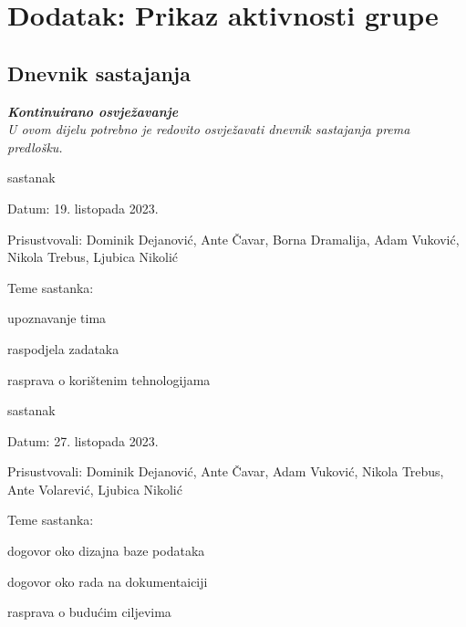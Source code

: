 \chapter*{Dodatak: Prikaz aktivnosti grupe}
		
		\section*{Dnevnik sastajanja}
		
		\textbf{\textit{Kontinuirano osvježavanje}}\\
		
		 \textit{U ovom dijelu potrebno je redovito osvježavati dnevnik sastajanja prema predlošku.}
		
		\begin{packed_enum}
			\item  sastanak
			
			\item[] \begin{packed_item}
				\item Datum: 19. listopada 2023.
				\item Prisustvovali: Dominik Dejanović, Ante Čavar, Borna Dramalija, Adam Vuković, Nikola Trebus, Ljubica Nikolić
				\item Teme sastanka:
				\begin{packed_item}
					\item  upoznavanje tima
					\item  raspodjela zadataka
					\item rasprava o korištenim tehnologijama
				\end{packed_item}
			\end{packed_item}
			
			\item  sastanak
			\item[] \begin{packed_item}
				\item Datum: 27. listopada 2023.
				\item Prisustvovali: Dominik Dejanović, Ante Čavar, Adam Vuković, Nikola Trebus, Ante Volarević, Ljubica Nikolić
				\item Teme sastanka:
				\begin{packed_item}
					\item  dogovor oko dizajna baze podataka
					\item  dogovor oko rada na dokumentaiciji
					\item rasprava o budućim ciljevima
				\end{packed_item}
			\end{packed_item}
			

\end{packed_enum}
